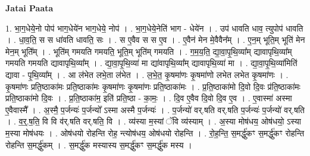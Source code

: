 \documentclass[17pt]{extarticle}
\begin{document}
\textbf{Jatai Paata} \newline

1. भा॒ग॒धेये॒नो पोप॑ भाग॒धेये॑न भाग॒धेये॒ नोप॑ । . भा॒ग॒धेये॒नेति॑ भाग - धेये॑न । . उप॑ धावति धाव॒ त्युपोप॑ धावति । . धा॒व॒ति॒ स स धा॑वति धावति॒ सः । . स ए॒वैव स स ए॒व । . ए॒वैन॑ मेन मे॒वैवैन᳚म् । . ए॒न॒म् भूति॒म् भूति॑ मेन मेन॒म् भूति᳚म् । . भूति॑म् गमयति गमयति॒ भूति॒म् भूति॑म् गमयति । . ग॒म॒य॒ति॒ द्या॒वा॒पृ॒थि॒व्या᳚म् द्यावापृथि॒व्या᳚म् गमयति गमयति द्यावापृथि॒व्या᳚म् । . द्या॒वा॒पृ॒थि॒व्या॑ मा द्या॑वापृथि॒व्या᳚म् द्यावापृथि॒व्या॑ मा । . द्या॒वा॒पृ॒थि॒व्या॑मिति॑ द्यावा - पृ॒थि॒व्या᳚म् । . आ ल॑भेत लभे॒ता ल॑भेत । . ल॒भे॒त॒ कृ॒षमा॑णः कृ॒षमा॑णो लभेत लभेत कृ॒षमा॑णः । . कृ॒षमा॑णः प्रति॒ष्ठाका॑मः प्रति॒ष्ठाका॑मः कृ॒षमा॑णः कृ॒षमा॑णः प्रति॒ष्ठाका॑मः । . प्र॒ति॒ष्ठाका॑मो दि॒वो दि॒वः प्र॑ति॒ष्ठाका॑मः प्रति॒ष्ठाका॑मो दि॒वः । . प्र॒ति॒ष्ठाका॑म॒ इति॑ प्रति॒ष्ठा - का॒मः॒ । . दि॒व ए॒वैव दि॒वो दि॒व ए॒व । . ए॒वास्मा॑ अस्मा ए॒वैवास्मै᳚ । . अ॒स्मै॒ प॒र्जन्यः॑ प॒र्जन्यो᳚ ऽस्मा अस्मै प॒र्जन्यः॑ । . प॒र्जन्यो॑ वर्.षति वर्.षति प॒र्जन्यः॑ प॒र्जन्यो॑ वर्.षति । . व॒र्॒.ष॒ति॒ वि वि व॑र्.षति वर्.षति॒ वि । . व्य॑स्या म॒स्यां ॅवि व्य॑स्याम् । . अ॒स्या मोष॑धय॒ ओष॑धयो॒ ऽस्या म॒स्या मोष॑धयः । . ओष॑धयो रोहन्ति रोह॒ न्त्योष॑धय॒ ओष॑धयो रोहन्ति । . रो॒ह॒न्ति॒ स॒मर्द्धु॑कꣳ स॒मर्द्धु॑कꣳ रोहन्ति रोहन्ति स॒मर्द्धु॑कम् । . स॒मर्द्धु॑क मस्यास्य स॒मर्द्धु॑कꣳ स॒मर्द्धु॑क मस्य । \newline
\end{document}
